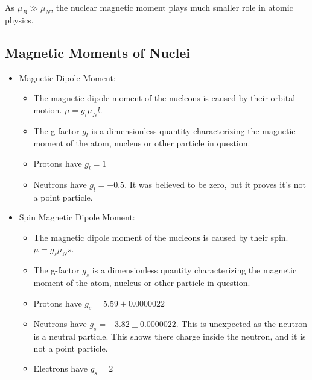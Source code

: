 As $μ_{B} ≫ μ_{N}$, the nuclear magnetic moment plays much smaller role in atomic physics.

\subsection{Magnetic Moments of Nuclei}
\begin{itemize}
    \item Magnetic Dipole Moment:
    \begin{itemize}
        \item The magnetic dipole moment of the nucleons is caused by their orbital motion. $μ = g_l μ_{N}l$. 
        \item The g-factor $g_l$ is a dimensionless quantity characterizing the magnetic moment of the atom, nucleus or other particle in question. 
        \item Protons have $g_l = 1$
        \item Neutrons have $g_l = -0.5$. It was believed to be zero, but it proves it's not a point particle.
    \end{itemize}
    \item Spin Magnetic Dipole Moment:
    \begin{itemize}
        \item The magnetic dipole moment of the nucleons is caused by their spin. $μ = g_s μ_{N}s$.
        \item The g-factor $g_s$ is a dimensionless quantity characterizing the magnetic moment of the atom, nucleus or other particle in question.
        \item Protons have $g_s = 5.59 ± 0.0000022$
        \item Neutrons have $g_s = -3.82 ± 0.0000022$. This is unexpected as the neutron is a neutral particle. This shows there charge inside the neutron, and it is not a point particle.
        \item Electrons have $g_s = 2$
    \end{itemize}
\end{itemize}

